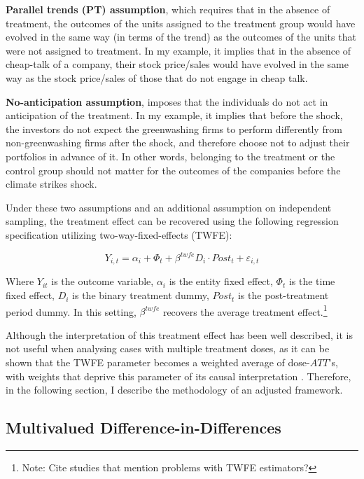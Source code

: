 \documentclass[12pt]{article}
\begin{document}
\textbf{Parallel trends (PT) assumption}, which requires that in the absence of treatment, the outcomes of the units assigned to the treatment group would have evolved in the same way (in terms of the trend) as the outcomes of the units that were not assigned to treatment. In my example, it implies that in the absence of cheap-talk of a company, their stock price/sales would have evolved in the same way as the stock price/sales of those that do not engage in cheap talk. 

\textbf{No-anticipation assumption}, imposes that the individuals do not act in anticipation of the treatment. In my example, it implies that before the shock, the investors do not expect the greenwashing firms to perform differently from non-greenwashing firms after the shock, and therefore choose not to adjust their portfolios in advance of it. In other words, belonging to the treatment or the control group should not matter for the outcomes of the companies before the climate strikes shock.

Under these two assumptions and an additional assumption on independent sampling, the treatment effect can be recovered using the following regression specification utilizing two-way-fixed-effects (TWFE):

\begin{equation}
    Y_{i,t} = \alpha_i + \Phi_t + \beta^{twfe} D_{i} \cdot Post_{t} + \varepsilon_{i,t}
\end{equation}

Where $Y_{it}$ is the outcome variable, $\alpha_i$ is the entity fixed effect, $\Phi_t$ is the time fixed effect, $D_i$ is the binary treatment dummy, $Post_t$ is the post-treatment period dummy. In this setting, $\beta^{twfe}$ recovers the average treatment effect.\footnote{Note: Cite studies that mention problems with TWFE estimators?} 

Although the interpretation of this treatment effect has been well described, it is not useful when analysing cases with multiple treatment doses, as it can be shown that the TWFE parameter becomes a weighted average of dose-$ATT$'s, with weights that deprive this parameter of its causal interpretation \parencite{callawayDifferenceinDifferencesContinuousTreatment2025}. Therefore, in the following section, I describe the methodology of an adjusted framework.

\subsection{Multivalued Difference-in-Differences}
\end{document}
